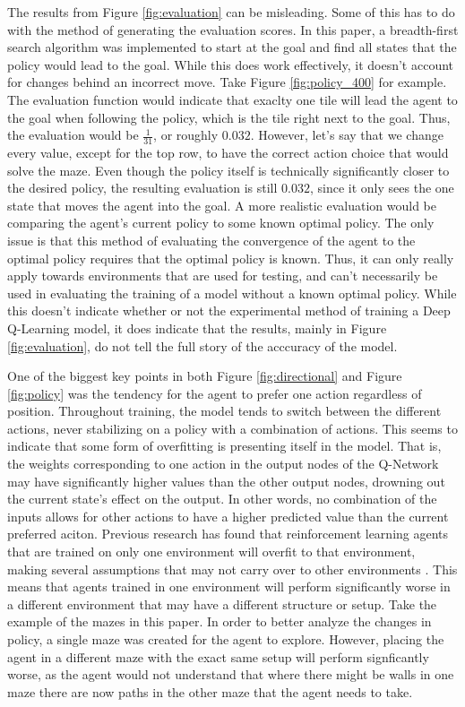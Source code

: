\documentclass[12pt,letterpaper]{article}
\begin{document}
The results from Figure \ref{fig:evaluation} can be misleading.
Some of this has to do with the method of generating the evaluation scores.
In this paper, a breadth-first search algorithm was implemented to start at the goal and find all states that the policy would lead to the goal.
While this does work effectively, it doesn't account for changes behind an incorrect move.
Take Figure \ref{fig:policy_400} for example.
The evaluation function would indicate that exaclty one tile will lead the agent to the goal when following the policy, which is the tile right next to the goal.
Thus, the evaluation would be $\frac{1}{31}$, or roughly $0.032$.
However, let's say that we change every value, except for the top row, to have the correct action choice that would solve the maze.
Even though the policy itself is technically significantly closer to the desired policy, the resulting evaluation is still $0.032$, since it only sees the one state that moves the agent into the goal.
A more realistic evaluation would be comparing the agent's current policy to some known optimal policy.
The only issue is that this method of evaluating the convergence of the agent to the optimal policy requires that the optimal policy is known.
Thus, it can only really apply towards environments that are used for testing, and can't necessarily be used in evaluating the training of a model without a known optimal policy.
While this doesn't indicate whether or not the experimental method of training a Deep Q-Learning model, it does indicate that the results, mainly in Figure \ref{fig:evaluation}, do not tell the full story of the acccuracy of the model.

One of the biggest key points in both Figure \ref{fig:directional} and Figure \ref{fig:policy} was the tendency for the agent to prefer one action regardless of position.
Throughout training, the model tends to switch between the different actions, never stabilizing on a policy with a combination of actions.
This seems to indicate that some form of overfitting is presenting itself in the model.
That is, the weights corresponding to one action in the output nodes of the Q-Network may have significantly higher values than the other output nodes, drowning out the current state's effect on the output.
In other words, no combination of the inputs allows for other actions to have a higher predicted value than the current preferred aciton.
Previous research has found that reinforcement learning agents that are trained on only one environment will overfit to that environment, making several assumptions that may not carry over to other environments \cite{article_overfitting_neural_networks}.
This means that agents trained in one environment will perform significantly worse in a different environment that may have a different structure or setup.
Take the example of the mazes in this paper. In order to better analyze the changes in policy, a single maze was created for the agent to explore.
However, placing the agent in a different maze with the exact same setup will perform signficantly worse, as the agent would not understand that where there might be walls in one maze there are now paths in the other maze that the agent needs to take.
\end{document}
